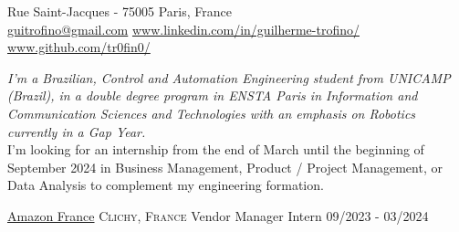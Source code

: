\documentclass[10pt, a4paper]{article}
\begin{document}
 



 Rue Saint-Jacques - 75005 Paris, France\\         %
\href{mailto:guitrofino@gmail.com}{guitrofino@gmail.com}\bull   %
\href{https://www.linkedin.com/in/guilherme-trofino/}{www.linkedin.com/in/guilherme-trofino/}\bull %
\href{https://github.com/tr0fin0}{www.github.com/tr0fin0/}       %

\spacedhrule{0.9em}{-0.4em}



\begin{multicols}{2}
\noindent \textit{I'm a Brazilian, Control and Automation Engineering student from UNICAMP (Brazil), in a double degree program in ENSTA Paris in Information and Communication Sciences and Technologies with an emphasis on Robotics currently in a Gap Year.}\\
\noindent I'm looking for an internship from the end of March until the beginning of September 2024 in Business Management, Product / Project Management, or Data Analysis to complement my engineering formation.
\end{multicols}

\spacedhrule{0.5em}{-0.4em}



\headedsection
    {\href{https://www.aboutamazon.fr/}{Amazon France}}
    {\textsc{Clichy, France}}
    {
        \headedsubsection
        {Vendor Manager Intern}
        {09/2023 - 03/2024}
        {}
    }
\end{document}
